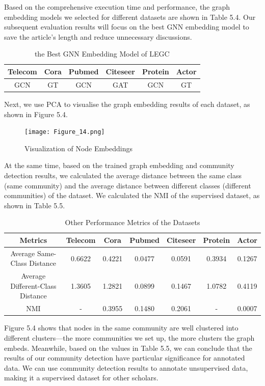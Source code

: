 \documentclass[ %
                    author={Tengyao Tu},
                supervisor={Dr. James Pope},
                    degree={MSc},
                     title={A New Perspective on Graph Community Detection: Combining Traditional Methods with Deep Learning Approaches},
                  subtitle={Applying to Telecom Networks and Diverse Datasets},
                      type={},
                      year={2024}]{dissertation}
\begin{document}
Based on the comprehensive execution time and performance, the graph embedding models we selected for different datasets are shown in Table 5.4. Our subsequent evaluation results will focus on the best GNN embedding model to save the article's length and reduce unnecessary discussions.
\begin{table}[!htbp] 
\centering 
\label{Basic Infomation} 
\caption{the Best GNN Embedding Model of LEGC} 
\vspace{5pt} 
\begin{tabular}{|cccccc|} 
\hline 
Telecom&Cora&Pubmed&Citeseer&Protein&Actor \\ 
\hline
GCN&GT&GCN&GAT&GCN&GT\\
\hline
\end{tabular}
\end{table}
Next, we use PCA to visualise the graph embedding results of each dataset, as shown in Figure 5.4. 
\begin{figure}[h!] %
    \centering
    \texttt{[image: Figure\_14.png]} %
    \caption{Visualization of Node Embeddings}
    \label{virtual Graph Data Map}
\end{figure}

At the same time, based on the trained graph embedding and community detection results, we calculated the average distance between the same class (same community) and the average distance between different classes (different communities) of the dataset. We calculated the NMI of the supervised dataset, as shown in Table 5.5.
\begin{table}[!htbp] 
\centering 
\label{Basic Infomation} 
\caption{Other Performance Metrics of the Datasets} 
\vspace{5pt} 
\begin{tabular}{ccccccc} 
\hline 
Metrics&Telecom&Cora&Pubmed&Citeseer&Protein&Actor \\ 
\hline
Average Same-Class Distance&0.6622&0.4221&0.0477&0.0591&0.3934&0.1267\\
Average Different-Class Distance&1.3605&1.2821&0.0899&0.1467&1.0782&0.4119\\
NMI&-&0.3955&0.1480&0.2061&-&0.0007\\
\hline
\end{tabular}
\end{table}

Figure 5.4 shows that nodes in the same community are well clustered into different clusters—the more communities we set up, the more clusters the graph embeds. Meanwhile, based on the values in Table 5.5, we can conclude that the results of our community detection have particular significance for annotated data. We can use community detection results to annotate unsupervised data, making it a supervised dataset for other scholars.
\end{document}

